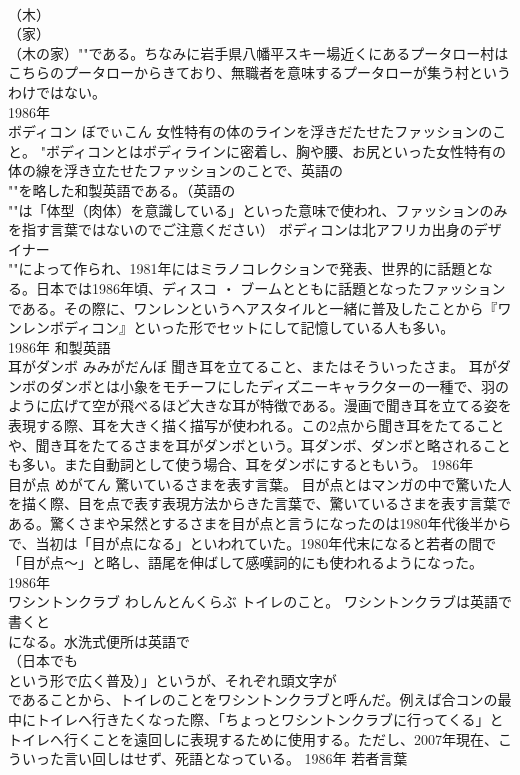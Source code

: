 \documentclass[8pt]{extreport}
\begin{document}
\begin{CJK}{UTF8}{min}
\\	（木）
\\	（家）
\\	（木の家）""である。ちなみに岩手県八幡平スキー場近くにあるプータロー村はこちらのプータローからきており、無職者を意味するプータローが集う村というわけではない。
\\	1986年	
\\	ボディコン	ぼでぃこん	女性特有の体のラインを浮きだたせたファッションのこと。	"ボディコンとはボディラインに密着し、胸や腰、お尻といった女性特有の体の線を浮き立たせたファッションのことで、英語の
\\	""を略した和製英語である。（英語の
\\	""は「体型（肉体）を意識している」といった意味で使われ、ファッションのみを指す言葉ではないのでご注意ください） ボディコンは北アフリカ出身のデザイナー
\\	""によって作られ、1981年にはミラノコレクションで発表、世界的に話題となる。日本では1986年頃、ディスコ ・ ブームとともに話題となったファッションである。その際に、ワンレンというヘアスタイルと一緒に普及したことから『ワンレンボディコン』といった形でセットにして記憶している人も多い。
\\	1986年	和製英語	
\\	耳がダンボ	みみがだんぼ	聞き耳を立てること、またはそういったさま。	耳がダンボのダンボとは小象をモチーフにしたディズニーキャラクターの一種で、羽のように広げて空が飛べるほど大きな耳が特徴である。漫画で聞き耳を立てる姿を表現する際、耳を大きく描く描写が使われる。この2点から聞き耳をたてることや、聞き耳をたてるさまを耳がダンボという。耳ダンボ、ダンボと略されることも多い。また自動詞として使う場合、耳をダンボにするともいう。	1986年	
\\	目が点	めがてん	驚いているさまを表す言葉。	目が点とはマンガの中で驚いた人を描く際、目を点で表す表現方法からきた言葉で、驚いているさまを表す言葉である。驚くさまや呆然とするさまを目が点と言うになったのは1980年代後半からで、当初は「目が点になる」といわれていた。1980年代末になると若者の間で「目が点～」と略し、語尾を伸ばして感嘆詞的にも使われるようになった。	1986年	
\\	ワシントンクラブ	わしんとんくらぶ	トイレのこと。	ワシントンクラブは英語で書くと
\\	になる。水洗式便所は英語で
\\	（日本でも
\\	という形で広く普及）」というが、それぞれ頭文字が
\\	であることから、トイレのことをワシントンクラブと呼んだ。例えば合コンの最中にトイレへ行きたくなった際、「ちょっとワシントンクラブに行ってくる」とトイレへ行くことを遠回しに表現するために使用する。ただし、2007年現在、こういった言い回しはせず、死語となっている。	1986年	若者言葉	

\end{CJK}
\end{document}
